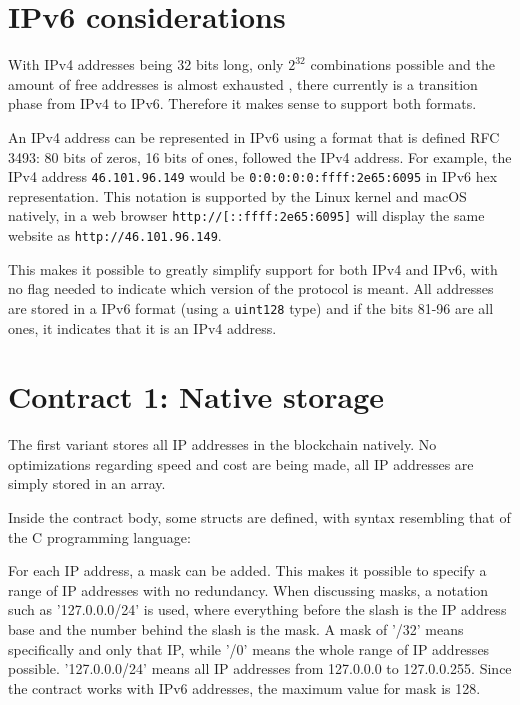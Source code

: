 \section{IPv6 considerations}

With IPv4 addresses being 32 bits long, only $ 2^{32} $ combinations possible and the amount of free addresses is almost exhausted \cite{IPv4Exhaustion}, there currently is a transition phase from IPv4 to IPv6. Therefore it makes sense to support both formats.

An IPv4 address can be represented in IPv6 using a format that is defined RFC 3493: 80 bits of zeros, 16 bits of ones, followed the IPv4 address. For example, the IPv4 address \texttt{46.101.96.149} would be \texttt{0:0:0:0:0:ffff:2e65:6095} in IPv6 hex representation. This notation is supported by the Linux kernel and macOS natively, in a web browser \texttt{http://[::ffff:2e65:6095]} will display the same website as \texttt{http://46.101.96.149}.

This makes it possible to greatly simplify support for both IPv4 and IPv6, with no flag needed to indicate which version of the protocol is meant. All addresses are stored in a IPv6 format (using a \texttt{uint128} type) and if the bits 81-96 are all ones, it indicates that it is an IPv4 address.

\section{Contract 1: Native storage}
The first variant stores all IP addresses in the blockchain natively. No optimizations regarding speed and cost are being made, all IP addresses are simply stored in an array.



Inside the contract body, some structs are defined, with syntax resembling that of the C programming language:



For each IP address, a mask can be added. This makes it possible to specify a range of IP addresses with no redundancy. 
When discussing masks, a notation such as '127.0.0.0/24' is used, where everything before the slash is the IP address base and the number behind the slash is the mask. A mask of '/32' means specifically and only that IP, while '/0' means the whole range of IP addresses possible. '127.0.0.0/24' means all IP addresses from 127.0.0.0 to 127.0.0.255. Since the contract works with IPv6 addresses, the maximum value for mask is 128.


